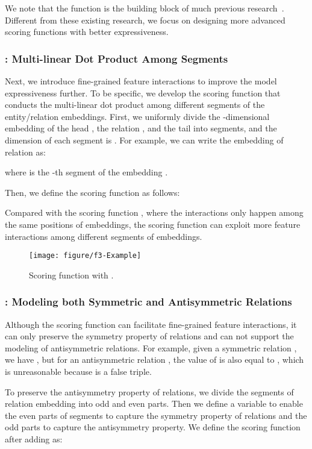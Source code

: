 \documentclass[11pt,a4paper]{article}
\begin{document}
We note that the function  is the building block of much previous research~\cite{trouillon2016complex,kadlec2017knowledge,kazemi2018simple}.
Different from these existing research, we focus on designing more advanced scoring functions with better expressiveness.




\subsubsection{: Multi-linear Dot Product Among Segments}

Next, we introduce fine-grained feature interactions to improve the model expressiveness further.
To be specific, we develop the scoring function  that conducts the multi-linear dot product among different segments of the entity/relation embeddings.
First, we uniformly divide the -dimensional embedding of the head , the relation , and the tail  into  segments, and the dimension of each segment is .
For example, we can write the embedding of relation  as:

where  is the -th segment of the embedding .

Then, we define the scoring function  as follows:

Compared with the scoring function , where the interactions only happen among the same positions of  embeddings, the scoring function  can exploit more feature interactions among different segments of embeddings.

\begin{figure}[!h]
	\centering
	\texttt{[image: figure/f3-Example]}
	\caption{Scoring function  with .}
	\label{fig:f3_example}
\end{figure}
\subsubsection{: Modeling both Symmetric and Antisymmetric Relations}
Although the scoring function  can facilitate fine-grained feature interactions, it can only preserve the symmetry property of relations and can not support the modeling of antisymmetric relations.
For example, given a symmetric relation , we have , but for an antisymmetric relation , the value of  is also equal to , which is unreasonable because  is a false triple.

To preserve the antisymmetry property of relations, we divide the segments of relation embedding  into odd and even parts. Then we define a variable  to enable the even parts of segments to capture the symmetry property of relations and the odd parts to capture the antisymmetry property. We define the scoring function after adding  as:
\end{document}
